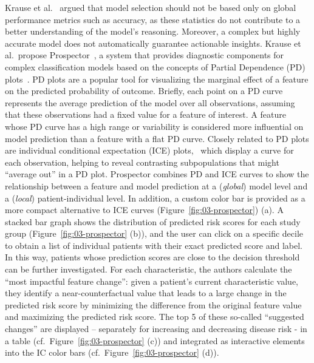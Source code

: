 \documentclass[
  oneside]{book}
\begin{document}
Krause et al.~\autocite{Krause:Prospector2016} argued that model selection should not be based only on global performance metrics such as accuracy, as these statistics do not contribute to a better understanding of the model's reasoning.
Moreover, a complex but highly accurate model does not automatically guarantee actionable insights.
Krause et al.~propose Prospector~\autocite{Krause:Prospector2016}, a system that provides diagnostic components for complex classification models based on the concepts of Partial Dependence (PD) plots~\autocite{Friedman:PDP2001}.
PD plots are a popular tool for visualizing the marginal effect of a feature on the predicted probability of outcome.
Briefly, each point on a PD curve represents the average prediction of the model over all observations, assuming that these observations had a fixed value for a feature of interest.
A feature whose PD curve has a high range or variability is considered more influential on model prediction than a feature with a flat PD curve.
Closely related to PD plots are individual conditional expectation (ICE) plots,~\autocite{Goldstein:ICE2015} which display a curve for each observation, helping to reveal contrasting subpopulations that might ``average out'' in a PD plot.
Prospector combines PD and ICE curves to show the relationship between a feature and model prediction at a (\emph{global}) model level and a (\emph{local}) patient-individual level.
In addition, a custom color bar is provided as a more compact alternative to ICE curves (Figure~\ref{fig:03-prospector}) (a).
A stacked bar graph shows the distribution of predicted risk scores for each study group (Figure~\ref{fig:03-prospector} (b)), and the user can click on a specific decile to obtain a list of individual patients with their exact predicted score and label.
In this way, patients whose prediction scores are close to the decision threshold can be further investigated.
For each characteristic, the authors calculate the ``most impactful feature change'': given a patient's current characteristic value, they identify a near-counterfactual value that leads to a large change in the predicted risk score by minimizing the difference from the original feature value and maximizing the predicted risk score.
The top 5 of these so-called ``suggested changes'' are displayed -- separately for increasing and decreasing disease risk - in a table (cf.~Figure~\ref{fig:03-prospector} (c)) and integrated as interactive elements into the IC color bars (cf.~Figure~\ref{fig:03-prospector} (d)).
\end{document}
